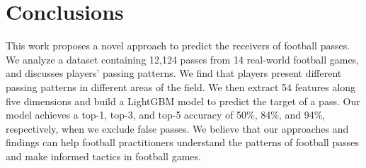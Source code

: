 \section{Conclusions} \label{conclusions}

This work proposes a novel approach to predict the receivers of football passes.
We analyze a dataset containing 12,124 passes from 14 real-world football games, and discusses players' passing patterns. We find that players present different passing patterns in different areas of the field.
We then extract 54 features along five dimensions and build a LightGBM model to predict the target of a pass. 
Our model achieves a top-1, top-3, and top-5 accuracy of 50\%, 84\%, and 94\%, respectively, when we exclude false passes.
We believe that our approaches and findings can help football practitioners understand the patterns of football passes and make informed tactics in football games.